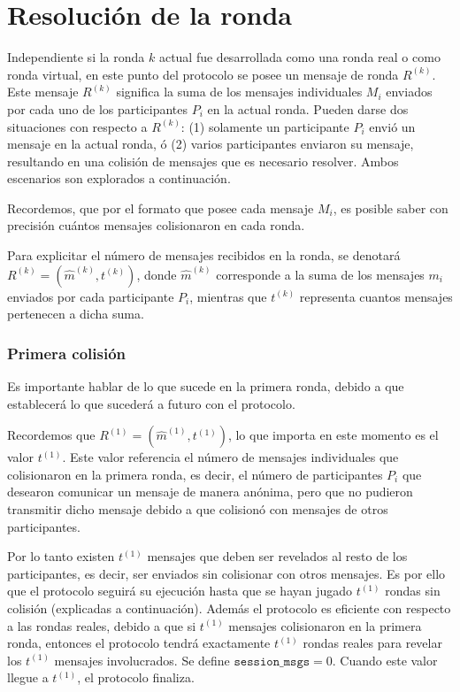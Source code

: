 \section{Resolución de la ronda}

Independiente si la ronda $k$ actual fue desarrollada como una ronda real o como 
ronda virtual, en este punto del protocolo se posee un mensaje de ronda $R^{(k)}$. 
Este mensaje $R^{(k)}$ significa la suma de los mensajes individuales $M_i$ 
enviados por cada uno de los participantes $P_i$ en la actual ronda. Pueden darse 
dos situaciones con respecto a $R^{(k)}$: (1) solamente un participante $P_i$ envió 
un mensaje en la actual ronda, ó (2) varios participantes enviaron su mensaje, 
resultando en una colisión de mensajes que es necesario resolver. Ambos escenarios 
son explorados a continuación.

Recordemos, que por el formato que posee cada mensaje $M_i$, es posible saber con 
precisión cuántos mensajes colisionaron en cada ronda.


Para explicitar el número de mensajes recibidos en la ronda, se denotará 
$R^{(k)} = (\hat{m}^{(k)}, t^{(k)})$, donde $\hat{m}^{(k)}$ corresponde a la suma de 
los mensajes $m_i$ enviados por cada participante $P_i$, mientras que $t^{(k)}$ 
representa cuantos mensajes pertenecen a dicha suma.

\subsubsection{Primera colisión}

Es importante hablar de lo que sucede en la primera ronda, debido a que establecerá lo 
que sucederá a futuro con el protocolo.

Recordemos que $R^{(1)} = (\hat{m}^{(1)}, t^{(1)})$, lo que importa en este momento es 
el valor $t^{(1)}$. Este valor referencia el número de mensajes individuales que 
colisionaron en la primera ronda, es decir, el número de participantes $P_i$ que desearon 
comunicar un mensaje de manera anónima, pero que no pudieron transmitir dicho mensaje 
debido a que colisionó con mensajes de otros participantes.

Por lo tanto existen $t^{(1)}$ mensajes que deben ser revelados al resto de los 
participantes, es decir, ser enviados sin colisionar con otros mensajes. Es por ello que 
el protocolo seguirá su ejecución hasta que se hayan jugado $t^{(1)}$ rondas sin colisión 
(explicadas a continuación). Además el protocolo es eficiente con respecto a las rondas 
reales, debido a que si $t^{(1)}$ mensajes colisionaron en la primera ronda, entonces el 
protocolo tendrá exactamente $t^{(1)}$ rondas reales para revelar los $t^{(1)}$ mensajes 
involucrados. Se define $\mathtt{session\_msgs} = 0$. Cuando este valor llegue a $t^{(1)}$, 
el protocolo finaliza.

